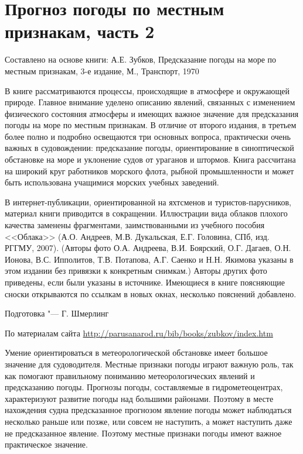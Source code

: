 \section{Прогноз погоды по местным признакам, часть 2}

\footnotesize{}

Составлено на основе книги: А.Е. Зубков, Предсказание погоды на море
по местным признакам, 3-е издание, М., Транспорт, 1970

В книге рассматриваются процессы, происходящие в атмосфере и
окружающей природе. Главное внимание уделено описанию явлений,
связанных с изменением физического состояния атмосферы и имеющих
важное значение для предсказания погоды на море по местным
признакам. В отличие от второго издания, в третьем более полно и
подробно освещаются три основных вопроса, практически очень важных в
судовождении: предсказание погоды, ориентирование в синоптической
обстановке на море и уклонение судов от ураганов и штормов. Книга
рассчитана на широкий круг работников морского флота, рыбной
промышленности и может быть использована учащимися морских учебных
заведений.

В интернет-публикации, ориентированной на яхтсменов и
туристов-парусников, материал книги приводится в
сокращении. Иллюстрации вида облаков плохого качества заменены
фрагментами, заимствованными из учебного пособия <<Облака>>
(А.О. Андреев, М.В. Дукальская, Е.Г. Головина, СПб, изд. РГГМУ,
2007). (Авторы фото О.А. Андреева, В.И. Боярский, О.Г. Дагаев,
О.Н. Ионова, В.С. Ипполитов, Т.В. Потапова, А.Г. Саенко и Н.Н. Якимова
указаны в этом издании без привязки к конкретным снимкам.) Авторы
других фото приведены, если были указаны в источнике. Имеющиеся в
книге поясняющие сноски открываются по ссылкам в новых окнах,
несколько пояснений добавлено.

Подготовка "--- Г. Шмерлинг

По материалам сайта \url{http://parusanarod.ru/bib/books/zubkov/index.htm}

\normalsize{}

Умение ориентироваться в метеорологической обстановке имеет большое
значение для судоводителя. Местные признаки погоды играют важную роль,
так как помогают правильному пониманию метеорологических явлений и
предсказанию погоды. Прогнозы погоды, составляемые в гидрометеоцентрах,
характеризуют развитие погоды над большими районами. Поэтому в месте
нахождения судна предсказанное прогнозом явление погоды может
наблюдаться несколько раньше или позже, или совсем не наступить, а
может наступить даже не предсказанное явление. Поэтому местные
признаки погоды имеют важное практическое значение.

